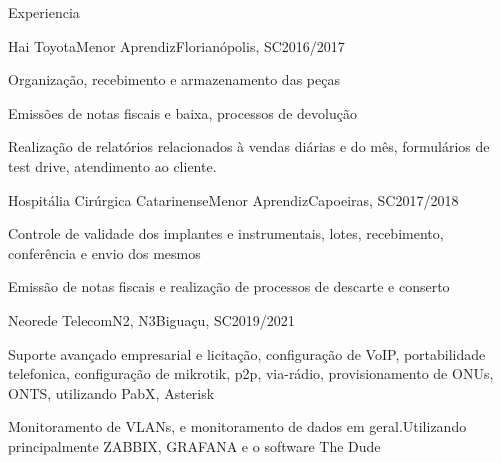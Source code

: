 \documentclass{article}
\newlength{\tabin}
\newlength{\secsep}
\newcommand{\lineunder}{\vspace*{-8pt} \\ \hspace*{-6pt} \hrulefill \\ \vspace*{-15pt}}
\newenvironment{tabbedsection}[1]{
  \begin{list}{}{
      \setlength{\itemsep}{0pt}
      \setlength{\labelsep}{0pt}
      \setlength{\labelwidth}{0pt}
      \setlength{\leftmargin}{\tabin}
      \setlength{\rightmargin}{\tabin}
      \setlength{\listparindent}{0pt}
      \setlength{\parsep}{0pt}
      \setlength{\parskip}{0pt}
      \setlength{\partopsep}{0pt}
      \setlength{\topsep}{#1}
    }
  \item[]
}{\end{list}}
\newenvironment{resume_section}[1]{
  \filbreak
  \vspace{2\secsep}
  \textsc{\large\color{sectionblue}#1}
  \lineunder
  \begin{tabbedsection}{\secsep}
}{\end{tabbedsection}}
\newenvironment{subitems}{
  \renewcommand{\labelitemi}{-}
  \begin{itemize}
      \setlength{\labelsep}{1em}
}{\end{itemize}}
\newenvironment{resume_employer}[4]{
  \vspace{\secsep}
  \textbf{#1} \\ 
  \indent {\small #2} \hfill {\footnotesize#3 (#4)}
  \begin{tabbedsection}{0pt}
  \begin{subitems}
}{\end{subitems}\end{tabbedsection}}
\begin{document}
\begin{resume_section}{Experiencia}
  \begin{resume_employer}{Hai Toyota}{Menor Aprendiz}{Florianópolis, SC}{2016/2017}
    \item Organização, recebimento e armazenamento das peças
    \item Emissões de notas fiscais e baixa, processos de devolução
    \item Realização de relatórios relacionados à vendas diárias e do mês, formulários de test drive, atendimento ao cliente.
  \end{resume_employer}
  
  \begin{resume_employer}{Hospitália Cirúrgica Catarinense}{Menor Aprendiz}{Capoeiras, SC}{2017/2018}
    \item Controle de validade dos implantes e instrumentais, lotes, recebimento, conferência e envio dos mesmos
    \item Emissão de notas fiscais e realização de processos de descarte e conserto
 \end{resume_employer}
 
\begin{resume_employer}{Neorede Telecom}{N2, N3}{Biguaçu, SC}{2019/2021}
    \item Suporte avançado empresarial e licitação, configuração de VoIP, portabilidade telefonica, configuração de mikrotik, p2p, via-rádio, provisionamento de ONUs, ONTS, utilizando PabX, Asterisk
    \item Monitoramento de VLANs, e monitoramento de dados em geral.Utilizando principalmente ZABBIX, GRAFANA e o software The Dude

      \end{resume_employer}
\end{resume_section}
\end{document}
